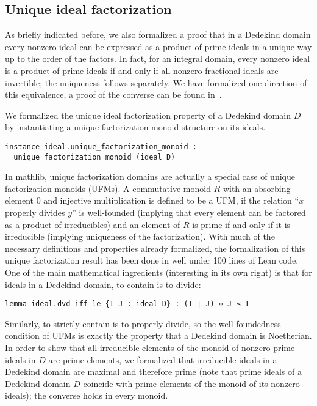 \documentclass[sn-mathphys]{sn-jnl}%
\newcommand{\mathlib}{\textsf{mathlib}\xspace}
\begin{document}
\subsection{Unique ideal factorization}\label{subsec:unique_ideal_factorization}

As briefly indicated before, we also formalized a proof that in a Dedekind domain every nonzero ideal can be expressed as a product of prime ideals in a unique way up to the order of the factors.
In fact, for an integral domain, every nonzero ideal is a product of prime ideals if and only if all nonzero fractional ideals are invertible; the uniqueness follows separately. We have formalized one direction of this equivalence, a proof of the converse can be found in~\cite[Chapter 5, \S6, Theorem 10]{Zariski-Samuel}.

We formalized the unique ideal factorization property of a Dedekind domain $D$ by instantiating a unique factorization monoid structure on its ideals.

\begin{lstlisting}
instance ideal.unique_factorization_monoid :
  unique_factorization_monoid (ideal D)
\end{lstlisting}

In \mathlib, unique factorization domains are actually a special case of unique factorization monoids (UFMs).
A commutative monoid $R$ with an absorbing element $0$ and injective multiplication is defined to be a UFM,
if the relation ``$x$ properly divides $y$'' is well-founded (implying that every element can be factored as a product of irreducibles) and
an element of $R$ is prime if and only if it is irreducible (implying uniqueness of the factorization).
With much of the necessary definitions and properties already formalized, the formalization of this unique factorization result has been done in well under 100 lines of Lean code. One of the main mathematical ingredients (interesting in its own right) is that for ideals in a Dedekind domain, to contain is to divide:

\begin{lstlisting}
lemma ideal.dvd_iff_le {I J : ideal D} : (I ∣ J) ↔ J ≤ I
\end{lstlisting}

Similarly, to strictly contain is to properly divide, so the well-foundedness condition of UFMs is exactly the property that a Dedekind domain is Noetherian. In order to show that all irreducible elements of the monoid of nonzero prime ideals in $D$ are prime elements, we formalized that irreducible ideals in a Dedekind domain are maximal and therefore prime (note that prime ideals of a Dedekind domain $D$ coincide with prime elements of the monoid of its nonzero ideals); the converse holds in every monoid.
\end{document}
